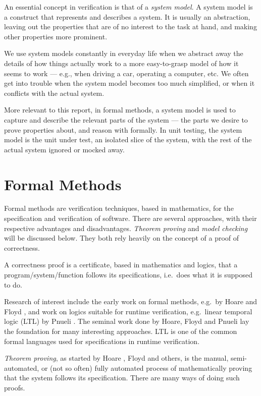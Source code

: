 \documentclass[a4paper,11pt]{kth-mag}
\begin{document}
An essential concept in verification is that of a \textit{system model}. A
system model is a construct that represents and describes a system. It is
usually an abstraction, leaving out the properties that are of no interest to
the task at hand, and making other properties more prominent.

We use system models constantly in everyday life when we abstract away the
details of how things actually work to a more easy-to-grasp model of how it
seems to work --- e.g., when driving a car, operating a computer, etc. We often
get into trouble when the system model becomes too much simplified, or when it
conflicts with the actual system.

More relevant to this report, in formal methods, a system model is used to
capture and describe the relevant parts of the system --- the parts we desire
to prove properties about, and reason with formally. In unit testing, the
system model is the unit under test, an isolated slice of the system, with
the rest of the actual system ignored or mocked away.


\section{Formal Methods} \label{section-formal-methods}

Formal methods are verification techniques, based in mathematics, for the
specification and verification of software. There are several approaches, with
their respective advantages and disadvantages. \textit{Theorem proving} and
\textit{model checking} will be discussed below. They both rely heavily on the
concept of a proof of correctness.

A correctness proof is a certificate, based in mathematics and logics, that a
program/system/function follows its specifications, i.e.\ does what it is
supposed to do.

Research of interest include the early work on formal methods, e.g.\ by Hoare
\cite{hoare69} and Floyd \cite{floyd67}, and work on logics suitable for
runtime verification, e.g.\ linear temporal logic (LTL) by Pnueli
\cite{pnueli77}. The seminal work done by Hoare, Floyd and Pnueli lay the
foundation for many interesting approaches. LTL is one of the common formal
languages used for specifications in runtime verification.

\textit{Theorem proving}, as started by Hoare \cite{hoare69}, Floyd
\cite{floyd67} and others, is the manual, semi-automated, or (not so often)
fully automated process of mathematically proving that the system follows its
specification. There are many ways of doing such proofs.
\end{document}
